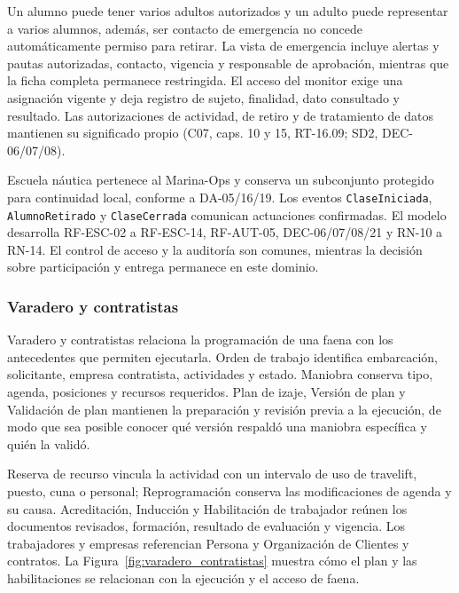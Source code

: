 Un alumno puede tener varios adultos autorizados y un adulto puede representar a varios alumnos, además, ser contacto de emergencia no concede automáticamente permiso para retirar. La vista de emergencia incluye alertas y pautas autorizadas, contacto, vigencia y responsable de aprobación, mientras que la ficha completa permanece restringida. El acceso del monitor exige una asignación vigente y deja registro de sujeto, finalidad, dato consultado y resultado. Las autorizaciones de actividad, de retiro y de tratamiento de datos mantienen su significado propio (C07, caps. 10 y 15, RT-16.09; SD2, DEC-06/07/08).

Escuela náutica pertenece al Marina-Ops y conserva un subconjunto protegido para continuidad local, conforme a DA-05/16/19. Los eventos \texttt{ClaseIniciada}, \texttt{AlumnoRetirado} y \texttt{ClaseCerrada} comunican actuaciones confirmadas. El modelo desarrolla RF-ESC-02 a RF-ESC-14, RF-AUT-05, DEC-06/07/08/21 y RN-10 a RN-14. El control de acceso y la auditoría son comunes, mientras la decisión sobre participación y entrega permanece en este dominio.

\subsubsection{Varadero y contratistas}
Varadero y contratistas relaciona la programación de una faena con los antecedentes que permiten ejecutarla. Orden de trabajo identifica embarcación, solicitante, empresa contratista, actividades y estado. Maniobra conserva tipo, agenda, posiciones y recursos requeridos. Plan de izaje, Versión de plan y Validación de plan mantienen la preparación y revisión previa a la ejecución, de modo que sea posible conocer qué versión respaldó una maniobra específica y quién la validó.

Reserva de recurso vincula la actividad con un intervalo de uso de travelift, puesto, cuna o personal; Reprogramación conserva las modificaciones de agenda y su causa. Acreditación, Inducción y Habilitación de trabajador reúnen los documentos revisados, formación, resultado de evaluación y vigencia. Los trabajadores y empresas referencian Persona y Organización de Clientes y contratos. La Figura~\ref{fig:varadero_contratistas} muestra cómo el plan y las habilitaciones se relacionan con la ejecución y el acceso de faena.

